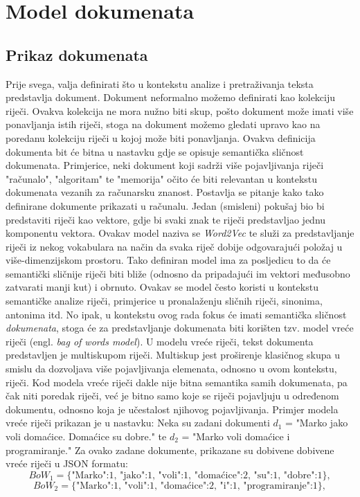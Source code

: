 \documentclass[times, utf8, zavrsni]{fer}
\begin{document}
\chapter{Model dokumenata}
\label{docmodel}

\section{Prikaz dokumenata}
\label{subchap:docmodel_docview}
Prije svega, valja definirati što u kontekstu analize i pretraživanja teksta predstavlja dokument. Dokument neformalno možemo definirati kao kolekciju riječi. Ovakva kolekcija ne mora nužno biti skup, pošto dokument može imati više ponavljanja istih riječi, stoga na dokument možemo gledati upravo kao na poredanu kolekciju riječi u kojoj može biti ponavljanja. Ovakva definicija dokumenta bit će bitna u nastavku gdje se opisuje semantička sličnost dokumenata. Primjerice, neki dokument koji sadrži više pojavljivanja riječi "računalo", "algoritam" te "memorija" očito će biti relevantan u kontekstu dokumenata vezanih za računarsku znanost. Postavlja se pitanje kako tako definirane dokumente prikazati u računalu. Jedan (smisleni) pokušaj bio bi predstaviti riječi kao vektore, gdje bi svaki znak te riječi predstavljao jednu komponentu vektora. Ovakav model naziva se \textit{Word2Vec} te služi za predstavljanje riječi iz nekog vokabulara na način da svaka riječ dobije odgovarajući položaj u više-dimenzijskom prostoru. Tako definiran model ima za posljedicu to da će semantički sličnije riječi biti bliže (odnosno da pripadajući im vektori međusobno zatvarati manji kut) i obrnuto. Ovakav se model često koristi u kontekstu semantičke analize riječi, primjerice u pronalaženju sličnih riječi, sinonima, antonima itd. No ipak, u kontekstu ovog rada fokus će imati semantička sličnost \textit{dokumenata}, stoga će za predstavljanje dokumenata biti korišten tzv. model vreće riječi (engl. \textit{bag of words model}). U modelu vreće riječi, tekst dokumenta predstavljen je multiskupom riječi. Multiskup jest proširenje klasičnog skupa u smislu da dozvoljava više pojavljivanja elemenata, odnosno u ovom kontekstu, riječi. Kod modela vreće riječi dakle nije bitna semantika samih dokumenata, pa čak niti poredak riječi, već je bitno samo koje se riječi pojavljuju u određenom dokumentu, odnosno koja je učestalost njihovog pojavljivanja. Primjer modela vreće riječi prikazan je u nastavku:
Neka su zadani dokumenti $d_{1}$ = "Marko jako voli domaćice. Domaćice su dobre." te $d_{2}$ = "Marko voli domaćice i programiranje." Za ovako zadane dokumente, prikazane su dobivene dobivene vreće riječi u JSON formatu:
\begin{equation}
{{BoW_{1}}=\{\text{{"Marko":1, "jako":1, "voli":1, "domaćice":2, "su":1, "dobre":1}}}\},
\end{equation}
\begin{equation}
{{BoW_{2}}=\{\text{{"Marko":1, "voli":1, "domaćice":2, "i":1, "programiranje":1}}}\},
\end{equation}
\end{document}

